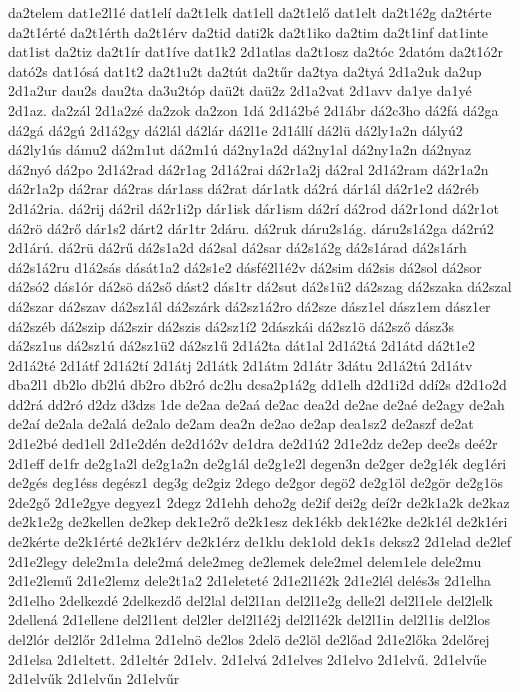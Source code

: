 {da2telem
dat1e2l1é
dat1elí
da2t1elk
dat1ell
da2t1elő
dat1elt
da2t1é2g
da2térte
da2t1érté
da2t1érth
da2t1érv
da2tid
dati2k
da2t1iko
da2tim
da2t1inf
dat1inte
dat1ist
da2tiz
da2t1ír
dat1íve
dat1k2
2d1atlas
da2t1osz
da2tóc
2datóm
da2t1ó2r
dató2s
dat1ósá
dat1t2
da2t1u2t
da2tút
da2tűr
da2tya
da2tyá
2d1a2uk
da2up
2d1a2ur
dau2s
dau2ta
da3u2tóp
daü2t
daü2z
2d1a2vat
2d1avv
da1ye
da1yé
2d1az.
da2zál
2d1a2zé
da2zok
da2zon
1dá
2d1á2bé
2d1ábr
dá2c3ho
dá2fá
dá2ga
dá2gá
dá2gú
2d1á2gy
dá2lál
dá2lár
dá2l1e
2d1állí
dá2lü
dá2ly1a2n
dályú2
dá2ly1ús
dámu2
dá2m1ut
dá2m1ú
dá2ny1a2d
dá2ny1al
dá2ny1a2n
dá2nyaz
dá2nyó
dá2po
2d1á2rad
dá2r1ag
2d1á2rai
dá2r1a2j
dá2ral
2d1á2ram
dá2r1a2n
dá2r1a2p
dá2rar
dá2ras
dár1ass
dá2rat
dár1atk
dá2rá
dár1ál
dá2r1e2
dá2réb
2d1á2ria.
dá2rij
dá2ril
dá2r1i2p
dár1isk
dár1ism
dá2rí
dá2rod
dá2r1ond
dá2r1ot
dá2rö
dá2rő
dár1s2
dárt2
dár1tr
2dáru.
dá2ruk
dáru2s1ág.
dáru2s1á2ga
dá2rú2
2d1árú.
dá2rü
dá2rű
dá2s1a2d
dá2sal
dá2sar
dá2s1á2g
dá2s1árad
dá2s1árh
dá2s1á2ru
d1á2sás
dását1a2
dá2s1e2
dásfé2l1é2v
dá2sim
dá2sis
dá2sol
dá2sor
dá2só2
dás1ór
dá2sö
dá2ső
dást2
dás1tr
dá2sut
dá2s1ü2
dá2szag
dá2szaka
dá2szal
dá2szar
dá2szav
dá2sz1ál
dá2szárk
dá2sz1á2ro
dá2sze
dász1el
dász1em
dász1er
dá2széb
dá2szip
dá2szir
dá2szis
dá2sz1í2
2dászkái
dá2sz1ö
dá2sző
dász3s
dá2sz1us
dá2sz1ú
dá2sz1ü2
dá2sz1ű
2d1á2ta
dát1al
2d1á2tá
2d1átd
dá2t1e2
2d1á2té
2d1átf
2d1á2tí
2d1átj
2d1átk
2d1átm
2d1átr
3dátu
2d1á2tú
2d1átv
dba2l1
db2lo
db2lú
db2ro
db2ró
dc2lu
dcsa2p1á2g
dd1elh
d2d1i2d
ddí2s
d2d1o2d
dd2rá
dd2ró
d2dz
d3dzs
1de
de2aa
de2aá
de2ac
dea2d
de2ae
de2aé
de2agy
de2ah
de2aí
de2ala
de2alá
de2alo
de2am
dea2n
de2ao
de2ap
dea1sz2
de2aszf
de2at
2d1e2bé
ded1ell
2d1e2dén
de2d1ó2v
de1dra
de2d1ú2
2d1e2dz
de2ep
dee2s
deé2r
2d1eff
de1fr
de2g1a2l
de2g1a2n
de2g1ál
de2g1e2l
degen3n
de2ger
de2g1ék
deg1éri
de2gés
deg1éss
degész1
deg3g
de2giz
2dego
de2gor
degö2
de2g1öl
de2gör
de2g1ös
2de2gő
2d1e2gye
degyez1
2degz
2d1ehh
deho2g
de2if
dei2g
deí2r
de2k1a2k
de2kaz
de2k1e2g
de2kellen
de2kep
dek1e2rő
de2k1esz
dek1ékb
dek1é2ke
de2k1él
de2k1éri
de2kérte
de2k1érté
de2k1érv
de2k1érz
de1klu
dek1old
dek1s
deksz2
2d1elad
de2lef
2d1e2legy
dele2m1a
dele2má
dele2meg
de2lemek
dele2mel
delem1ele
dele2mu
2d1e2lemű
2d1e2lemz
dele2t1a2
2d1eleteté
2d1e2l1é2k
2d1e2lél
delés3s
2d1elha
2d1elho
2delkezdé
2delkezdő
del2lal
del2l1an
del2l1e2g
delle2l
del2l1ele
del2lelk
2dellená
2d1ellene
del2l1ent
del2ler
del2l1é2j
del2l1é2k
del2l1in
del2l1is
del2los
del2lór
del2lőr
2d1elma
2d1elnö
de2los
2delö
de2löl
de2lőad
2d1e2lőka
2delőrej
2d1elsa
2d1eltett.
2d1eltér
2d1elv.
2d1elvá
2d1elves
2d1elvo
2d1elvű.
2d1elvűe
2d1elvűk
2d1elvűn
2d1elvűr
}
